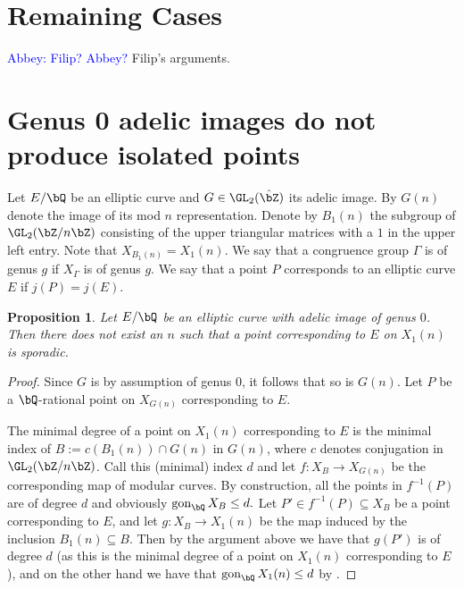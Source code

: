 \documentclass[11pt,reqno]{amsart}
\theoremstyle{plain}
\newtheorem{proposition}[theorem]{Proposition}
\theoremstyle{definition}
\DeclareMathOperator{\gon}{gon}
\newcommand{\Q}{\bQ}
\newcommand{\Z}{\bZ}
\newcommand{\abbey}[1]{\textcolor{blue}{Abbey: #1}}
\begin{document}
\section{Remaining Cases}
\abbey{Filip? Abbey?}
Filip's arguments.



\section{Genus 0 adelic images do not produce isolated points}

Let $E/ \Q$ be an elliptic curve and $G\in \GL_2(\hat \Z)$ its adelic image. By $G(n)$ denote the image of its mod $n$ representation. Denote by $B_1(n)$ the subgroup of $\GL_2(\Z/n\Z)$ consisting of the upper triangular matrices with a $1$ in the upper left entry. Note that $X_{B_1(n)}=X_1(n)$. We say that a congruence group $\Gamma$ is of genus $g$ if $X_\Gamma$ is of genus $g$. We say that a point $P$ corresponds to an elliptic curve $E$ if $j(P)=j(E)$.

\begin{proposition}
Let $E/\Q$ be an elliptic curve with adelic image of genus $0$. Then there does not exist an $n$ such that a point corresponding to $E$ on $X_1(n)$ is sporadic.
\end{proposition}
\begin{proof}
Since $G$ is by assumption of genus $0$, it follows that so is $G(n)$. Let $P$ be a $\Q$-rational point on $X_{G(n)}$ corresponding to $E$. 


The minimal degree of a point on $X_1(n)$ corresponding to $E$ is the minimal index of $B:=c(B_1(n))\cap G(n)$ in $G(n)$, where $c$ denotes conjugation in $\GL_2(\Z /n \Z)$. 
Call this (minimal) index $d$ and let $f:X_{B}\rightarrow X_{G(n)}$ be the corresponding map of modular curves. By construction, all the points in $f^{-1}(P)$ are of degree $d$ and obviously $\gon_\Q X_{B}\leq d.$ Let $P'\in f^{-1}(P) \subseteq X_{B}$ be a point corresponding to $E$, and let $g:X_{B}\rightarrow X_1(n)$ be the map induced by the inclusion $B_1(n) \subseteq B$. Then by the argument above we have that $g(P')$ is of degree $d$ (as this is the minimal degree of a point on $X_1(n)$ corresponding to $E$), and on the other hand we have that $\gon_\Q X_1(n)\leq d$ by \cite[Proposition A.1 (vii)]{Poonen:gonality}.
\end{proof}


\vspace{20 mm}


\end{document}
